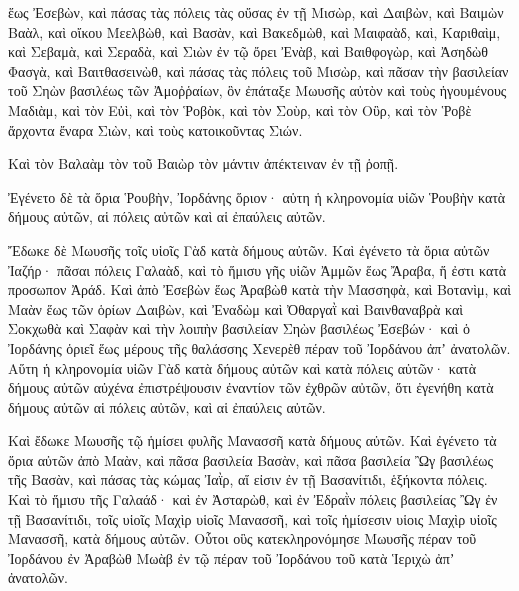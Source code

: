 {ἕως Ἐσεβὼν, καὶ πάσας τὰς πόλεις τὰς οὔσας ἐν τῇ Μισὼρ, καὶ Δαιβὼν, καὶ Βαιμὼν Βαὰλ, καὶ οἴκου Μεελβὼθ,
καὶ Βασὰν, καὶ Βακεδμὼθ, καὶ Μαιφαὰδ, καὶ, Καριθαὶμ,
καὶ Σεβαμὰ, καὶ Σεραδὰ, καὶ Σιὼν ἐν τῷ ὄρει Ἐνὰβ,
καὶ Βαιθφογὼρ, καὶ Ἀσηδὼθ Φασγὰ, καὶ Βαιτθασεινὼθ,
καὶ πάσας τὰς πόλεις τοῦ Μισὼρ, καὶ πᾶσαν τὴν βασιλείαν τοῦ Σηὼν βασιλέως τῶν Ἀμοῤῥαίων, ὃν ἐπάταξε Μωυσῆς αὐτὸν καὶ τοὺς ἡγουμένους Μαδιὰμ, καὶ τὸν Εὐὶ, καὶ τὸν Ῥοβὸκ, καὶ τὸν Σοὺρ, καὶ τὸν Οὒρ, καὶ τὸν Ῥοβὲ ἄρχοντα ἔναρα Σιὼν, καὶ τοὺς κατοικοῦντας Σιών.
\par }{\PP {}Καὶ τὸν Βαλαὰμ τὸν τοῦ Βαιὼρ τὸν μάντιν ἀπέκτειναν ἐν τῇ ῥοπῇ.
\par }{\PP {}Ἐγένετο δὲ τὰ ὅρια Ῥουβὴν, Ἰορδάνης ὅριον· αὑτη ἡ κληρονομία υἱῶν Ῥουβὴν κατὰ δήμους αὐτῶν, αἱ πόλεις αὐτῶν καὶ αἱ ἐπαύλεις αὐτῶν.
\par }{\PP {}Ἔδωκε δὲ Μωυσῆς τοῖς υἱοῖς Γὰδ κατὰ δήμους αὐτῶν.
Καὶ ἐγένετο τὰ ὅρια αὐτῶν Ἰαζήρ· πᾶσαι πόλεις Γαλαὰδ, καὶ τὸ ἥμισυ γῆς υἱῶν Ἀμμῶν ἕως Ἄραβα, ἥ ἐστι κατὰ προσωπον Ἀράδ.
Καὶ ἀπὸ Ἐσεβὼν ἕως Ἀραβὼθ κατὰ τὴν Μασσηφὰ, καὶ Βοτανὶμ, καὶ Μαὰν ἕως τῶν ὁρίων Δαιβὼν,
καὶ Ἐναδὼμ καὶ Ὀθαργαῒ καὶ Βαινθαναβρὰ καὶ Σοκχωθὰ καὶ Σαφὰν καὶ τὴν λοιπὴν βασιλείαν Σηὼν βασιλέως Ἐσεβών· καὶ ὁ Ἰορδάνης ὁριεῖ ἕως μέρους τῆς θαλάσσης Χενερὲθ πέραν τοῦ Ἰορδάνου ἀπʼ ἀνατολῶν.
Αὕτη ἡ κληρονομία υἱῶν Γὰδ κατὰ δήμους αὐτῶν καὶ κατὰ πόλεις αὐτῶν· κατὰ δήμους αὐτῶν αὐχένα ἐπιστρέψουσιν ἐναντίον τῶν ἐχθρῶν αὐτῶν, ὅτι ἐγενήθη κατὰ δήμους αὐτῶν αἱ πόλεις αὐτῶν, καὶ αἱ ἐπαύλεις αὐτῶν.
\par }{\PP {}Καὶ ἔδωκε Μωυσῆς τῷ ἡμίσει φυλῆς Μανασσῆ κατὰ δήμους αὐτῶν.
Καὶ ἐγένετο τὰ ὅρια αὐτῶν ἀπὸ Μαὰν, καὶ πᾶσα βασιλεία Βασὰν, καὶ πᾶσα βασιλεία Ὢγ βασιλέως τῆς Βασὰν, καὶ πάσας τὰς κώμας Ἰαῒρ, αἵ εἰσιν ἐν τῇ Βασανίτιδι, ἑξήκοντα πόλεις.
Καὶ τὸ ἥμισυ τῆς Γαλαάδ· καὶ ἐν Ἀσταρὼθ, καὶ ἐν Ἐδραῒν πόλεις βασιλείας Ὢγ ἐν τῇ Βασανίτιδι, τοῖς υἱοῖς Μαχὶρ υἱοῖς Μανασσῆ, καὶ τοῖς ἡμίσεσιν υἱοις Μαχὶρ υἱοῖς Μανασσῆ, κατὰ δήμους αὐτῶν.
Οὗτοι οὓς κατεκληρονόμησε Μωυσῆς πέραν τοῦ Ἰορδάνου ἐν Ἀραβὼθ Μωὰβ ἐν τῷ πέραν τοῦ Ἰορδάνου τοῦ κατὰ Ἱεριχὼ ἀπʼ ἀνατολῶν.

}
